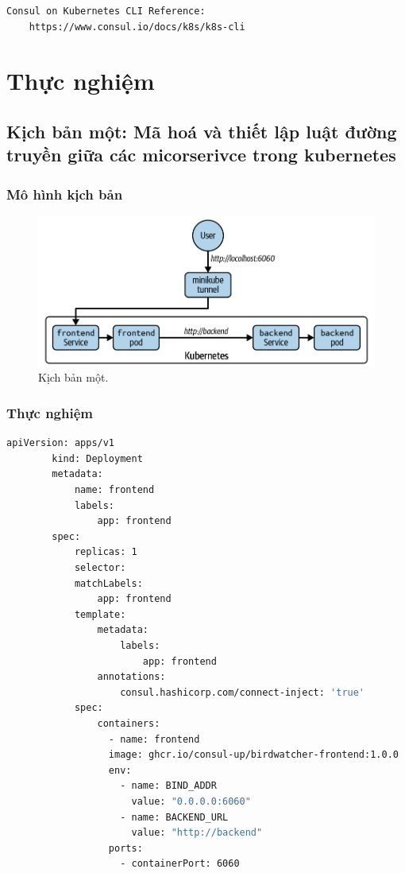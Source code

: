 \documentclass[14pt,a4paper]{report}
\begin{document}
{\begin{lstlisting}[language=Bash]
	Consul on Kubernetes CLI Reference:       
	https://www.consul.io/docs/k8s/k8s-cli
	\end{lstlisting}
	\hspace{1.0cm}{Vậy là chúng ta đã triển khai thành công Consul lên trên Kubernetes. Tiếp theo, chúng ta sẽ đến với các phần thực nghiệm.}
	\section{Thực nghiệm}
	\subsection{Kịch bản một: Mã hoá và thiết lập luật đường truyền giữa các micorserivce trong kubernetes}
	\subsubsection{Mô hình kịch bản}
	 \begin{figure}[h]
		\centering
		\includegraphics[width=1\linewidth]{Pics/kb1}
		\caption{\label{fig:kb1} Kịch bản một.}
		\label{fig:kb1}
	\end{figure}
	
	\hspace{1.0cm}{Ở trong kịch bản này, mục tiêu của chúng ta là sẽ tiến hành mã hoá và thiết lập các luật cho microservice. Các cách mã hoá sẽ được giải thích ở phần bên dưới.}
	\subsubsection{Thực nghiệm}
	\hspace{1.0cm}{Đầu tiên, chúng ta có tạo một tệp tin cấu hình của ứng dụng và service dành cho frontend, nội dung của tệp tin đó như sau:}
	\begin{lstlisting}[language=Bash]
		apiVersion: apps/v1
		kind: Deployment
		metadata:
			name: frontend
			labels:
				app: frontend
		spec:
			replicas: 1
			selector:
			matchLabels:
				app: frontend
			template:
				metadata:
					labels:
						app: frontend
				annotations:
					consul.hashicorp.com/connect-inject: 'true'
			spec:
				containers:
				  - name: frontend
				  image: ghcr.io/consul-up/birdwatcher-frontend:1.0.0
				  env:
					- name: BIND_ADDR
					  value: "0.0.0.0:6060"
					- name: BACKEND_URL
					  value: "http://backend"
				  ports:
				    - containerPort: 6060
	\end{lstlisting}

}
\end{document}
